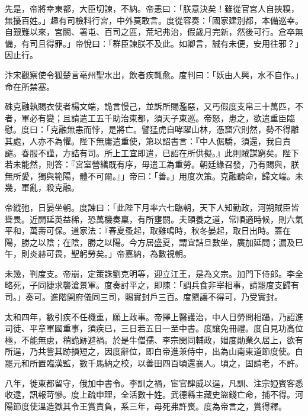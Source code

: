 \begin{pinyinscope}
 先是，帝將幸東都，大臣切諫，不納。帝恚曰：「朕意決矣！雖從官宮人自挾糗，無擾百姓。」趣有司檢料行宮，中外莫敢言。度從容奏：「國家建別都，本備巡幸。自艱難以來，宮闕、署屯、百司之區，荒圮弗治，假歲月完新，然後可行。倉卒無備，有司且得罪。」帝悅曰：「群臣諫朕不及此。如卿言，誠有未便，安用往邪？」因止行。



 汴宋觀察使令狐楚言亳州聖水出，飲者疾輒愈。度判曰：「妖由人興，水不自作。」命在所禁塞。



 硃克融執賜衣使者楊文端，詭言慢己，並訴所賜濫惡，又丐假度支帛三十萬匹，不者，軍必有變；且請遣工五千助治東都，須天子東巡。帝怒，患之，欲遣重臣臨慰。度曰：「克融無恚而悖，是將亡。譬猛虎自哮躍山林，憑窟穴則然，勢不得離其處，人亦不為懼。陛下無庸遣重使，第以詔書言：『中人倨驕，須還，我自責譴。春服不謹，方詰有司。所上工宜即遣，已詔在所供擬。』此則賊謀窮矣。陛下若未能然，則答：『宮室營繕既有序，毋遣工為重勞。朝廷緣召發，乃有賜與，朕無所愛，獨與範陽，體不可爾。』」帝曰：「善。」用度次策。克融聽命，歸文端。未幾，軍亂，殺克融。



 帝縱弛，日晏坐朝。度諫曰：「此陛下月率六七臨朝，天下人知勤政，河朔賊臣皆聳畏。近開延英益稀，恐萬機奏稟，有所壅閼。夫頤養之道，常順適時候，則六氣平和，萬壽可保。道家法：『春夏蚤起，取雞鳴時，秋冬晏起，取日出時。蓋在陽，勝之以陰；在陰，勝之以陽。今方居盛夏，謂宜詰旦數坐，廣加延問；漏及巳午，則炎赫可畏，聖躬勞矣。」帝嘉納，為數視朝。



 未幾，判度支。帝崩，定策誅劉克明等，迎立江王，是為文宗。加門下侍郎。李全略死，子同捷求襲滄景軍。度奏討平之，即陳：「調兵食非宰相事，請罷度支歸有司。」奏可。進階開府儀同三司，賜實封戶三百。度懇讓不得可，乃受實封。



 太和四年，數引疾不任機重，願上政事。帝擇上醫護治，中人日勞問相躡，乃詔進司徒、平章軍國重事，須疾已，三日若五日一至中書。度讓免冊禮。度自見功高位極，不能無慮，稍詭跡避禍。於是牛僧孺、李宗閔同輔政，媢度勛業久居上，欲有所逞，乃共訾其跡損短之，因度辭位，即白帝進兼侍中，出為山南東道節度使。白罷元和所置臨漢監，數千馬納之校，以善田四百頃還襄人。頃之，固請老，不許。



 八年，徙東都留守，俄加中書令。李訓之禍，宦官肆威以逞，凡訓、注宗婭賓客悉收逮，訊報苛慘。度上疏申理，全活數十姓。武德縣主藏史盜錢亡命，捕不得。河陽節度使溫造獄其令王賞責負，系三年，母死弗許喪。度為帝言之，賞得釋。




\end{pinyinscope}
